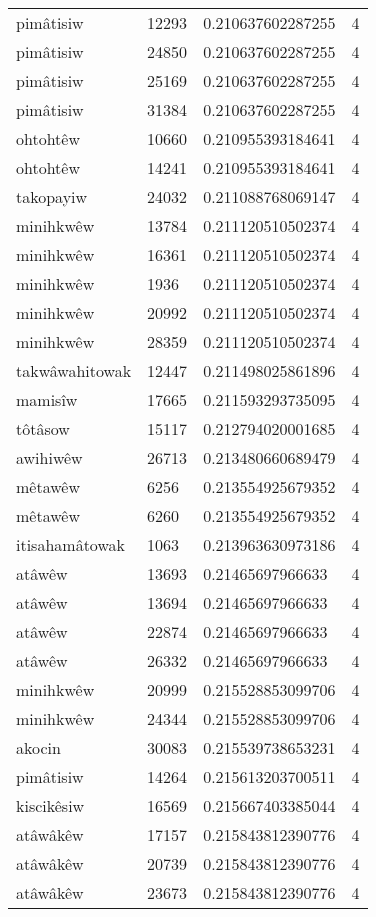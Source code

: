 \begin{longtable}{llll}
pimâtisiw & 12293 & 0.210637602287255 & 4 \\
pimâtisiw & 24850 & 0.210637602287255 & 4 \\
pimâtisiw & 25169 & 0.210637602287255 & 4 \\
pimâtisiw & 31384 & 0.210637602287255 & 4 \\
ohtohtêw & 10660 & 0.210955393184641 & 4 \\
ohtohtêw & 14241 & 0.210955393184641 & 4 \\
takopayiw & 24032 & 0.211088768069147 & 4 \\
minihkwêw & 13784 & 0.211120510502374 & 4 \\
minihkwêw & 16361 & 0.211120510502374 & 4 \\
minihkwêw & 1936 & 0.211120510502374 & 4 \\
minihkwêw & 20992 & 0.211120510502374 & 4 \\
minihkwêw & 28359 & 0.211120510502374 & 4 \\
takwâwahitowak & 12447 & 0.211498025861896 & 4 \\
mamisîw & 17665 & 0.211593293735095 & 4 \\
tôtâsow & 15117 & 0.212794020001685 & 4 \\
awihiwêw & 26713 & 0.213480660689479 & 4 \\
mêtawêw & 6256 & 0.213554925679352 & 4 \\
mêtawêw & 6260 & 0.213554925679352 & 4 \\
itisahamâtowak & 1063 & 0.213963630973186 & 4 \\
atâwêw & 13693 & 0.21465697966633 & 4 \\
atâwêw & 13694 & 0.21465697966633 & 4 \\
atâwêw & 22874 & 0.21465697966633 & 4 \\
atâwêw & 26332 & 0.21465697966633 & 4 \\
minihkwêw & 20999 & 0.215528853099706 & 4 \\
minihkwêw & 24344 & 0.215528853099706 & 4 \\
akocin & 30083 & 0.215539738653231 & 4 \\
pimâtisiw & 14264 & 0.215613203700511 & 4 \\
kiscikêsiw & 16569 & 0.215667403385044 & 4 \\
atâwâkêw & 17157 & 0.215843812390776 & 4 \\
atâwâkêw & 20739 & 0.215843812390776 & 4 \\
atâwâkêw & 23673 & 0.215843812390776 & 4 \\

\end{longtable}
